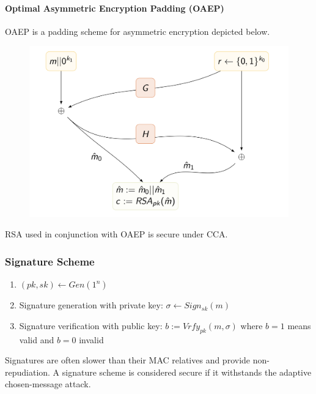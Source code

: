 \paragraph{Optimal Asymmetric Encryption Padding (OAEP)}
OAEP is a padding scheme for asymmetric encryption depicted below.
\begin{figure}[H]
  \centering
  \includegraphics[width=.7\textwidth]{figures/oaep.png}
\end{figure}

RSA used in conjunction with OAEP is secure under CCA\@.

\subsubsection{Signature Scheme}
\begin{enumerate}
  \item $(pk,sk) \leftarrow Gen(1^n)$
  \item Signature generation with private key: $\sigma \leftarrow Sign_{sk}(m)$
  \item Signature verification with public key: $b := Vrfy_{pk}(m,\sigma)$ where $b = 1$ means valid and $b = 0$ invalid
\end{enumerate}
Signatures are often slower than their MAC relatives and provide non-repudiation.
A signature scheme is considered secure if it withstands the adaptive chosen-message attack.
\newpage


